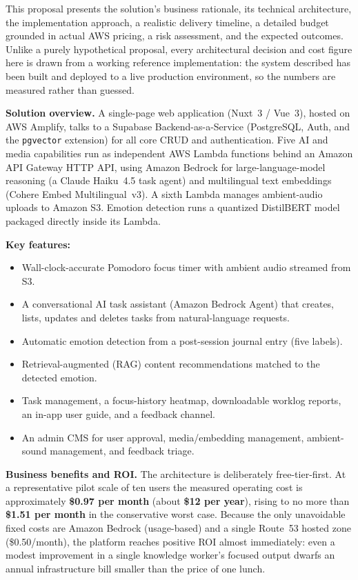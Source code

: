 \documentclass[a4paper,11pt]{article}
\begin{document}
	This proposal presents the solution's business rationale, its technical architecture,
	the implementation approach, a realistic delivery timeline, a detailed budget grounded
	in actual AWS pricing, a risk assessment, and the expected outcomes. Unlike a purely
	hypothetical proposal, every architectural decision and cost figure here is drawn from a
	working reference implementation: the system described has been built and deployed to a
	live production environment, so the numbers are measured rather than guessed.

	\medskip
	\noindent\textbf{Solution overview.} A single-page web application (Nuxt~3 / Vue~3),
	hosted on AWS Amplify, talks to a Supabase Backend-as-a-Service (PostgreSQL, Auth, and
	the \texttt{pgvector} extension) for all core CRUD and authentication. Five AI and media
	capabilities run as independent AWS Lambda functions behind an Amazon API Gateway HTTP
	API, using Amazon Bedrock for large-language-model reasoning (a Claude Haiku~4.5 task
	agent) and multilingual text embeddings (Cohere Embed Multilingual~v3). A sixth Lambda
	manages ambient-audio uploads to Amazon S3. Emotion detection runs a quantized DistilBERT
	model packaged directly inside its Lambda.

	\medskip
	\noindent\textbf{Key features:}
	\begin{itemize}
		\item Wall-clock-accurate Pomodoro focus timer with ambient audio streamed from S3.
		\item A conversational AI task assistant (Amazon Bedrock Agent) that creates, lists,
		      updates and deletes tasks from natural-language requests.
		\item Automatic emotion detection from a post-session journal entry (five labels).
		\item Retrieval-augmented (RAG) content recommendations matched to the detected emotion.
		\item Task management, a focus-history heatmap, downloadable worklog reports, an
		      in-app user guide, and a feedback channel.
		\item An admin CMS for user approval, media/embedding management, ambient-sound
		      management, and feedback triage.
	\end{itemize}

	\medskip
	\noindent\textbf{Business benefits and ROI.} The architecture is deliberately
	free-tier-first. At a representative pilot scale of ten users the measured operating cost
	is approximately \textbf{\$0.97 per month} (about \textbf{\$12 per year}), rising to no
	more than \textbf{\$1.51 per month} in the conservative worst case. Because the only
	unavoidable fixed costs are Amazon Bedrock (usage-based) and a single Route~53 hosted
	zone (\$0.50/month), the platform reaches positive ROI almost immediately: even a modest
	improvement in a single knowledge worker's focused output dwarfs an annual infrastructure
	bill smaller than the price of one lunch.
\end{document}
